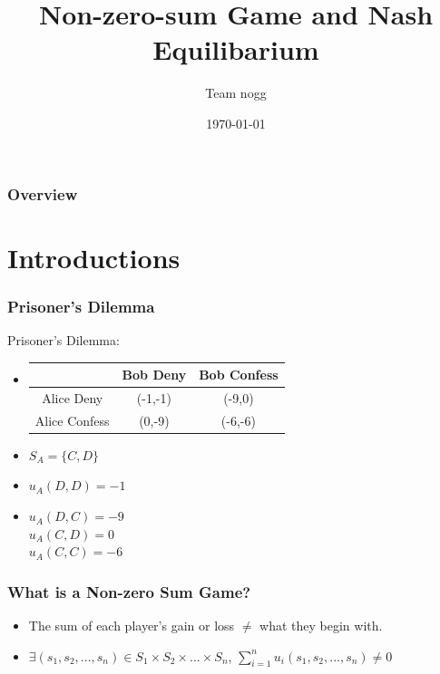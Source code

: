 \documentclass{beamer}
\title[Short title]{Non-zero-sum Game and Nash Equilibarium}
\author{Team nogg}
\institute[SJTU]
{

}
\date{\today}
\begin{document}
\begin{frame}
\titlepage
\end{frame}

\begin{frame}
\frametitle{Overview}
\tableofcontents
\end{frame}

\section{Introductions}


\begin{frame}
\frametitle{Prisoner's Dilemma}
Prisoner's Dilemma:\\
\begin{itemize}[<+->]
\item
\begin{tabular}{|c|c|c|}
\hline
\hline
    &{\color{red}Bob} Deny&{\color{red}Bob} Confess\\
\hline
{\color{blue}Alice} Deny& ({\color{blue}-1},{\color{red}-1}) & ({\color{blue}-9},{\color{red}0})\\
\hline
{\color{blue}Alice} Confess& ({\color{blue}0},{\color{red}-9}) & ({\color{blue}-6},{\color{red}-6})\\
\hline
\hline
\end{tabular}
\item
{\color{blue}$S_A = \{ C, D\}$}  
\item
{\color{blue}$u_A(D,D) = -1$} 
\item
{\color{blue}$u_A(D,C) = -9$} \\
{\color{blue}$u_A(C,D) = 0 $} \text{ } \\
{\color{blue}$u_A(C,C) = -6$} 
\end{itemize}
\end{frame}

\begin{frame}
\frametitle{What is a Non-zero Sum Game?}
\begin{itemize}
\item
The sum of each player's gain or loss $\neq$ what they begin with.
\item
$\exists (s_1,s_2,...,s_n)\in S_1\times S_2 \times ... \times S_n$, $\sum_{i=1}^{n} u_i(s_1,s_2,...,s_n) \neq 0$
\end{itemize}
\end{frame}
\end{document}

